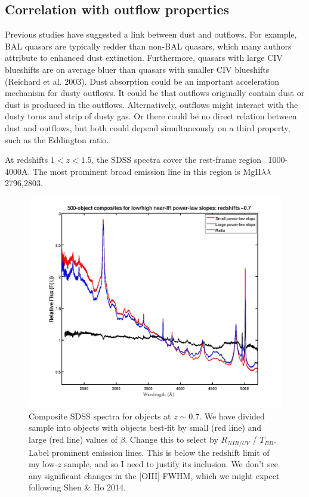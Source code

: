 \subsection{Correlation with outflow properties}

Previous studies have suggested a link between dust and outflows. 
For example, BAL quasars are typically redder than non-BAL quasars, which many authors attribute to enhanced dust extinction. 
Furthermore, quasars with large CIV blueshifts are on average bluer than quasars with smaller CIV blueshifts (Reichard et al. 2003). 
Dust absorption could be an important acceleration mechanism for dusty outflows. 
It could be that outflows originally contain dust or dust is produced in the outflows. 
Alternatively, outflows might interact with the dusty torus and strip of dusty gas. 
Or there could be no direct relation between dust and outflows, but both could depend simultaneously on a third property, such as the Eddington ratio. 

At redshifts $1 < z < 1.5$, the SDSS spectra cover the rest-frame region ~1000-4000A. 
The most prominent broad emission line in this region is MgII${\lambda}{\lambda}$2796,2803. 

\begin{figure}
  \centering
  \includegraphics[width=\textwidth]{figures/chapter06/z07_pls_comps.jpg}
  \caption{Composite SDSS spectra for objects at $z\sim0.7$. We have divided sample into objects with objects best-fit by small (red line) and large (red line) values of $\beta$. Change this to select by $R_{NIR/UV}$ / $T_{BB}$. Label prominent emission lines. This is below the redshift limit of my low-$z$ sample, and so I need to justify its inclusion. We don't see any significant changes in the [OIII] FWHM, which we might expect following Shen \& Ho 2014. }
  \label{fig:}
\end{figure}


